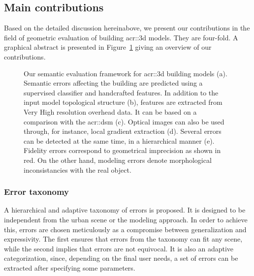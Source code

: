     \subsection{Main contributions}
        \label{sec::introduction::contributions::contributions}
        Based on the detailed discussion hereinabove, we present our contributions in the field of geometric evaluation of building \gls{acr::3d} models.
        They are four-fold.
        A graphical abstract is presented in Figure~\ref{fig::graphical_abstract} giving an overview of our contributions.
        \begin{figure}[htpb]
            \centering
                        
            \caption[
                Our semantic evaluation framework for \acrshort*{acr::3d} building models.
            ]{
                \label{fig::graphical_abstract} Our semantic evaluation framework for \gls{acr::3d} building models (a).
                Semantic errors affecting the building are predicted using a supervised classifier and handcrafted features.
                In addition to the input model topological structure (b), features are extracted from Very High resolution overhead data.
                It can be based on a comparison with the \gls*{acr::dsm} (c).
                Optical images can also be used through, for instance, local gradient extraction (d).
                Several errors can be detected at the same time, in a hierarchical manner (e).
                Fidelity errors correspond to geometrical imprecision as shown in red.
                On the other hand, modeling errors denote morphological inconsistancies with the real object.
            }
        \end{figure}
        \subsubsection{Error taxonomy}
            A hierarchical and adaptive taxonomy of errors is proposed.
            It is designed to be independent from the urban scene or the modeling approach.
            In order to achieve this, errors are chosen meticulously as a compromise between generalization and expressivity.
            The first ensures that errors from the taxonomy can fit any scene, while the second implies that errors are not equivocal.
            It is also an adaptive categorization, since, depending on the final user needs, a set of errors can be extracted after specifying some parameters.
            
